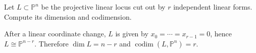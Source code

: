 \begin{problem}\label{prob:vi36-04}
Let \(L\subset\mathbb P^n\) be the projective linear locus cut out by \(r\) independent linear forms.  Compute its dimension and codimension.
\begin{solution}
After a linear coordinate change, \(L\) is given by \(x_0=\cdots=x_{r-1}=0\), hence \(L\cong\mathbb P^{n-r}\).  Therefore \(\dim L=n-r\) and \(\operatorname{codim}(L,\mathbb P^n)=r\).
\end{solution}
\end{problem}

